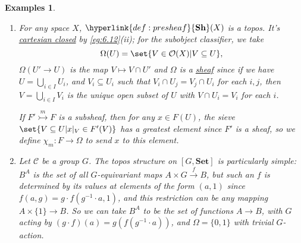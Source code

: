 \documentclass{article}
\let\to\longrightarrow
\let\mapsto\longmapsto
\newtheorem{nexample}[nthm]{Examples}
\begin{document}
\begin{nexample}
\begin{enumerate}[label=(\alph*)]
      Given $B \overset{f}\to A$ and a sieve $R$ on $A$, we define $f^* R$ to be the set of $g$ with codomain $B$ such that $fg \in R$.
      This makes $\Omega$ into a \hyperlink{def:funct}{functor} $\mathscr{C}^{\text{op}} \to \mathbf{Set}$, as follows.
      $\top: 1 \to \Omega$ is defined by $\top_A(*) = \{\text{all morphisms with codomain }A\}$.
      Given a subfunctor $F' \overset{m}\rightarrowtail F$, we define $\chi_m:F \to \Omega$ by
      \begin{equation*}
        (\chi_m)_A(x) = \set{f : B \to A | Ff(x) \in F'(B)}.
      \end{equation*}
      This is the unique \hyperlink{def:nattrans}{natural transformation} making
      \begin{equation*}
        \begin{tikzcd}
          F' \rar \dar[tail]{m} & 1 \dar[tail]{\top} \\
          F \rar & \Omega
        \end{tikzcd}
      \end{equation*}
      a \hyperlink{def:pullback}{pullback}.
    \item For any space $X$, $\hyperlink{def:presheaf}{\mathbf{Sh}}(X)$ is a topos.
      It's \hyperlink{def:cc}{cartesian closed} by \cref{eg:6.12}(ii); for the subobject classifier, we take
      \begin{equation*}\Omega(U)  = \set{V \in \mathcal{O}(X) | V \subseteq U},\end{equation*}
      $\Omega(U' \to U)$ is the map $V \mapsto V \cap U'$ and $\Omega$ is a \hyperlink{def:presheaf}{sheaf} since if we have $U = \bigcup_{i \in I} U_i$, and $V_i \subseteq U_i$ such that $V_i \cap U_j = V_j \cap U_i$ for each $i,j$,
      then $V = \bigcup_{i \in I} V_i$ is the unique open subset of $U$ with $V \cap U_i = V_i$ for each $i$.

      If $F' \overset{m}\rightarrowtail F$ is a subsheaf, then for any $x \in F(U)$, the sieve $\set{V \subseteq U | x|_V \in F'(V)}$ has a greatest element since $F'$ is a sheaf, so we define $\chi_m: F \to \Omega$ to send $x$ to this element.
    \item Let $\mathscr{C}$ be a group $G$.
      The topos structure on $[G, \mathbf{Set}]$ is particularly simple: $B^A$ is the set of all $G$-equivariant maps $A \times G \overset{f}\to B$, but such an $f$ is determined by its values at elements of the form $(a,1)$ since $f(a,g) = g \cdot f(g^{-1} \cdot a, 1)$, and this restriction can be any mapping $A \times \{1\} \to B$.
      So we can take $B^A$ to be the set of functions $A \to B$, with $G$ acting by $(g \cdot f) (a) = g (f (g^{-1} \cdot a))$, and $\Omega = \{0,1\}$ with trivial $G$-action.


\end{enumerate}
\end{nexample}
\end{document}
